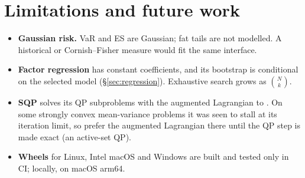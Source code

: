 \documentclass[11pt,a4paper]{article}
\begin{document}
\section{Limitations and future work}\label{sec:limitations}
\begin{itemize}
  \item \textbf{Gaussian risk.} VaR and ES are Gaussian; fat tails are not modelled. A
        historical or Cornish--Fisher measure would fit the same interface.
  \item \textbf{Factor regression} has constant coefficients, and its bootstrap is
        conditional on the selected model (\S\ref{sec:regression}). Exhaustive search grows
        as $\binom Nk$.
  \item \textbf{SQP} solves its QP subproblems with the augmented Lagrangian to
        . On some strongly convex mean-variance problems it was seen to
        stall at its iteration limit, so prefer the augmented Lagrangian there until the QP
        step is made exact (an active-set QP).
  \item \textbf{Wheels} for Linux, Intel macOS and Windows are built and tested only in CI;
        locally, on macOS arm64.
\end{itemize}
\end{document}

